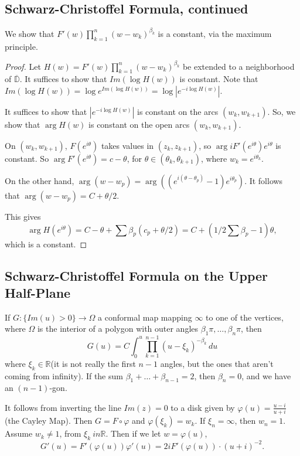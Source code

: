 \documentclass[12pt]{scrartcl}
\newcommand{\R}{\mathbb{R}}
\let \phi \varphi
\let \ol \overline
\begin{document}
\subsection{Schwarz-Christoffel Formula, continued}
We show that $F'(w) \prod_{k=1}^n (w - w_k)^{\beta_k}$ is a constant, via the maximum principle. 
\begin{proof}
Let $H(w) = F'(w) \prod_{k=1}^n (w - w_k)^{\beta_k}$ be extended to a neighborhood of $\ol{\mathbb D}$.  It suffices to show that $Im(\log H(w))$ is constant.  Note that $Im(\log H(w)) = \log e^{Im(\log H(w))} = \log |e^{-i\log H(w)}|.$

It suffices to show that $|e^{-i\log H(w)}|$ is constant on the arcs $(w_k, w_{k+1})$.  So, we show that $\arg H(w)$ is constant  on the open arcs $(w_k, w_{k+1})$.

On $(w_k, w_{k+1})$, $F(e^{i\theta})$ takes values in $(z_k, z_{k+1})$, so $\arg iF'(e^{i\theta})e^{i\theta}$ is constant.    So $\arg F'(e^{i\theta}) = c-\theta$, for $\theta \in (\theta_k, \theta_{k+1})$, where $w_k = e^{i\theta_k}$.

On the other hand, $\arg (w - w_p) = \arg((e^{i(\theta - \theta_p)} - 1)e^{i\theta_p})$.  It follows that $\arg(w - w_p) = C + \theta/2$.

This gives
$$\arg H(e^{i\theta}) = C - \theta + \sum \beta_p(c_p + \theta/2) = C + (1/2 \sum \beta_p - 1)\theta,$$
which is a constant.

\end{proof} 
\subsection{Schwarz-Christoffel Formula on the Upper Half-Plane}
If $G: \{Im(u) > 0\} \to \Omega$ a conformal map mapping $\infty$ to one of the vertices, where $\Omega$ is the interior of a polygon with outer angles $\beta_1\pi, \dots, \beta_n \pi$, then
$$G(u) = C \int_{0}^u \prod_{k=1}^{n-1} (u - \xi_k)^{-\beta_k}\,du$$
where $\xi_k \in \R$(it is not really the first $n-1$ angles, but the ones that aren't coming from infinity).  If the sum $\beta_1 + \dots + \beta_{n-1} = 2$, then $\beta_n = 0$, and we have an $(n-1)$-gon.

It follows from inverting the line $Im(z) = 0$ to a disk given by $\phi(u) = \frac{u-i}{u+i}$(the Cayley Map).  Then $G = F \circ \phi$ and $\phi(\xi_k) = w_k$.  If $\xi_n = \infty$, then $w_n = 1$.  Assume $w_k \ne 1$, from $\xi_k \ in \R$.  Then if we let $w = \phi(u)$,
$$G'(u) = F'(\phi(u)) \phi'(u) = 2i F'(\phi(u)) \cdot (u + i)^{-2}. $$
\end{document}
